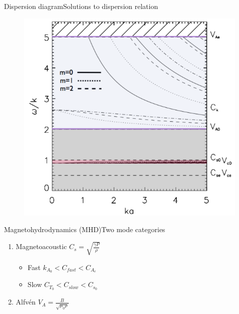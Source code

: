 \documentclass[table]{beamer}
\begin{document}
\begin{frame}{Dispersion diagram}{Solutions to dispersion relation}
    \begin{figure}
        \includegraphics[width=0.65\paperwidth]{disp_diagram.png}
    \end{figure}
\end{frame}%
\begin{frame}{Magnetohydrodynamics (MHD)}{Two mode categories}
        \begin{enumerate}
            \item \textcolor{bblue}{Magnetoacoustic}
                $C_s = \sqrt{\frac{\gamma P}{\rho}}$
                \begin{itemize}
                    \item Fast $k_{A_0} < C_{fast} < C_{A_e} $
                    \item Slow $C_{T_0} < C_{slow} < C_{s_0} $
                \end{itemize}
            \item \textcolor{bblue}{Alfv\'en}
                $V_A = \frac{B}{\sqrt{\mu_0\rho}}$
        \end{enumerate}
\end{frame}%
\end{document}
